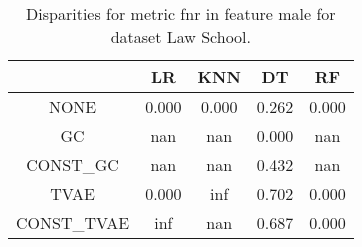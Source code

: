 \begin{table}
\caption{Disparities for metric fnr in feature male for dataset Law School.}
\label{tab:disp-LAW SCHOOL-male-fnr}
\begin{tabular}{ccccc}
\toprule
 & LR & KNN & DT & RF \\
\midrule
NONE & 0.000 & 0.000 & 0.262 & 0.000 \\
GC & nan & nan & 0.000 & nan \\
CONST\_GC & nan & nan & 0.432 & nan \\
TVAE & 0.000 & inf & 0.702 & 0.000 \\
CONST\_TVAE & inf & nan & 0.687 & 0.000 \\
\bottomrule
\end{tabular}
\end{table}
